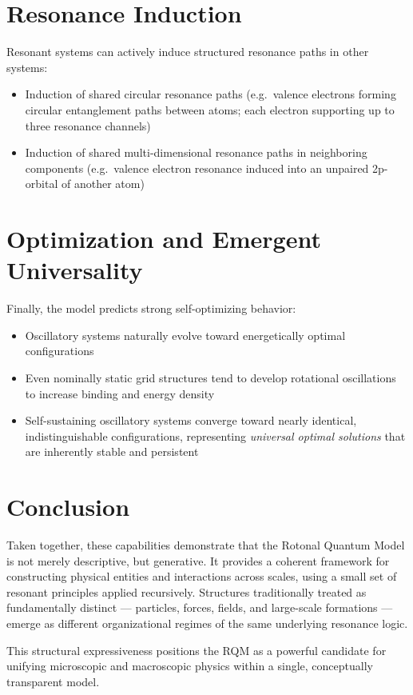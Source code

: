 \section{Resonance Induction}

Resonant systems can actively induce structured resonance paths in other systems:

\begin{itemize}
  \item Induction of shared circular resonance paths (e.g.\ valence electrons forming circular entanglement paths between atoms; each electron supporting up to three resonance channels)
  \item Induction of shared multi-dimensional resonance paths in neighboring components (e.g.\ valence electron resonance induced into an unpaired 2p-orbital of another atom)
\end{itemize}

\section{Optimization and Emergent Universality}

Finally, the model predicts strong self-optimizing behavior:

\begin{itemize}
  \item Oscillatory systems naturally evolve toward energetically optimal configurations
  \item Even nominally static grid structures tend to develop rotational oscillations to increase binding and energy density
  \item Self-sustaining oscillatory systems converge toward nearly identical, indistinguishable configurations, representing \emph{universal optimal solutions} that are inherently stable and persistent
\end{itemize}

\section{Conclusion}

Taken together, these capabilities demonstrate that the Rotonal Quantum Model is not merely descriptive, but generative. It provides a coherent framework for constructing physical entities and interactions across scales, using a small set of resonant principles applied recursively. Structures traditionally treated as fundamentally distinct --- particles, forces, fields, and large-scale formations --- emerge as different organizational regimes of the same underlying resonance logic.

This structural expressiveness positions the RQM as a powerful candidate for unifying microscopic and macroscopic physics within a single, conceptually transparent model.